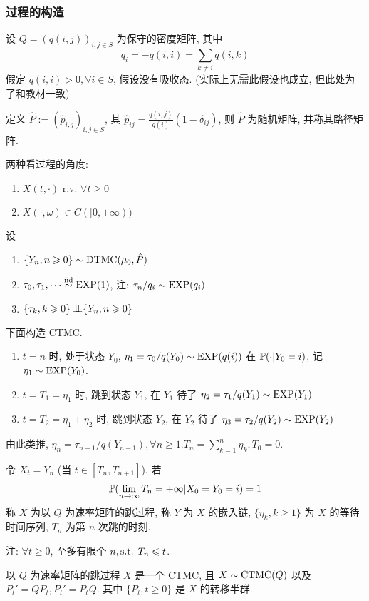 \subsubsection{过程的构造}
设 $Q=(q(i,j))_{i,j\in S}$ 为保守的密度矩阵, 其中
\[
q_i=-q(i,i)=\sum_{k\neq i}q(i,k)
\]
假定 $q(i,i)>0, \forall i\in S$, 假设没有吸收态. (实际上无需此假设也成立, 但此处为了和教材一致)

定义 $\hat{P}:=(\hat{p}_{i,j})_{i,j\in S}$, 其 $\hat{p}_{ij}=\frac{q(i,j)}{q(i)}(1-\delta_{ij})$, 则 $\hat{P}$ 为随机矩阵, 并称其路径矩阵.

两种看过程的角度:
\begin{enumerate}
    \item $X(t,\cdot)$ r.v. $\forall t\geq 0$
    \item $X(\cdot,\omega)\in C([0,+\infty))$
\end{enumerate}

设
\begin{enumerate}
    \item $\{Y_n,n\geqslant 0\}\sim \operatorname{DTMC}(\mu_0,\hat{P})$
    \item $\tau_0,\tau_1,\cdots \overset{\text{iid}}{\sim} \operatorname{EXP}(1)$, 注: $\tau_n/q_i\sim \operatorname{EXP}(q_i)$
    \item $\{\tau_k,k\geqslant 0\}\operatorname{\perp\!\!\!\perp} \{Y_n,n\geqslant 0\}$
\end{enumerate}
下面构造 CTMC.
\begin{enumerate}
    \item $t=n$ 时, 处于状态 $Y_0$, $\eta_1=\tau_0/q(Y_0)\sim \operatorname{EXP}(q(i))$ 在 $\mathbb{P}(\cdot|Y_0=i)$, 记 $\eta_1\sim \operatorname{EXP}(Y_0)$.
    \item $t=T_1=\eta_1$ 时, 跳到状态 $Y_1$, 在 $Y_1$ 待了 $\eta_2=\tau_1/q(Y_1)\sim\operatorname{EXP}(Y_1)$
    \item $t=T_2=\eta_1+\eta_2$ 时, 跳到状态 $Y_2$, 在 $Y_2$ 待了 $\eta_3=\tau_2/q(Y_2)\sim\operatorname{EXP}(Y_2)$
\end{enumerate}
由此类推, $\eta_n=\tau_{n-1}/q(Y_{n-1}),\forall n\geq 1. T_n=\sum_{k=1}^n\eta_k,T_0=0$.

令 $X_t=Y_n$ (当 $t\in [T_n,T_{n+1}]$), 若
\begin{equation}
    \mathbb{P}(\lim_{n \to \infty}T_n=+\infty|X_0=Y_0=i)=1
    \label{eq:p129-**}
\end{equation}
称 $X$ 为以 $Q$ 为速率矩阵的跳过程, 称 $Y$ 为 $X$ 的嵌入链, $\{\eta_k,k\geq 1\}$ 为 $X$ 的等待时间序列, $T_n$ 为第 $n$ 次跳的时刻.

注: $\forall t\geq 0$, 至多有限个 $n, \text{s.t. } T_n\leqslant t$.

\begin{lemma}
    以 $Q$ 为速率矩阵的跳过程 $X$ 是一个 CTMC, 且 $X\sim \operatorname{CTMC}(Q)$ 以及 $P_t'=QP_t,P_t'=P_t Q$. 其中 $\{P_t,t\geq 0\}$ 是 $X$ 的转移半群.
\end{lemma}

